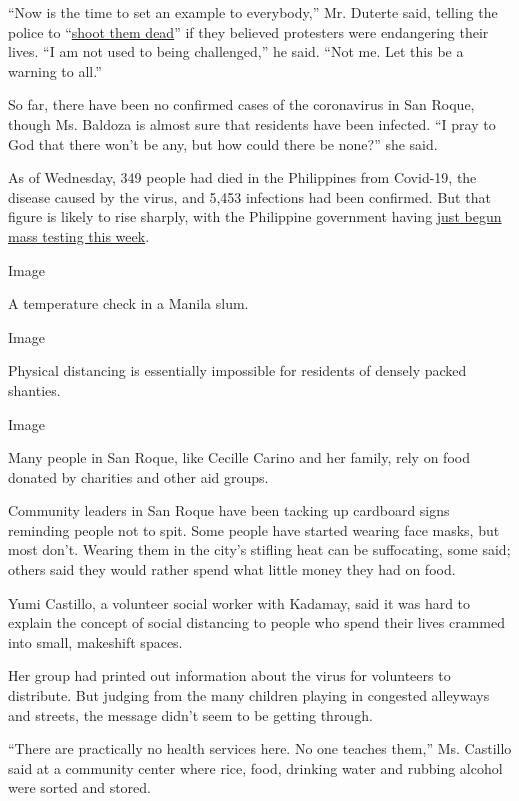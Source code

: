 ``Now is the time to set an example to everybody,'' Mr. Duterte said,
telling the police to
``\href{https://www.nytimes.com/reuters/2020/04/02/world/asia/02reuters-health-coronavirus-philippines-duterte.html?searchResultPosition=6}{shoot
them dead}'' if they believed protesters were endangering their lives.
``I am not used to being challenged,'' he said. ``Not me. Let this be a
warning to all.''

So far, there have been no confirmed cases of the coronavirus in San
Roque, though Ms. Baldoza is almost sure that residents have been
infected. ``I pray to God that there won't be any, but how could there
be none?'' she said.

As of Wednesday, 349 people had died in the Philippines from Covid-19,
the disease caused by the virus, and 5,453 infections had been
confirmed. But that figure is likely to rise sharply, with the
Philippine government having
\href{https://www.nytimes.com/reuters/2020/04/14/world/asia/14reuters-health-coronavirus-philippines.html?searchResultPosition=21}{just
begun mass testing this week}.

Image

A temperature check in a Manila slum.

Image

Physical distancing is essentially impossible for residents of densely
packed shanties.

Image

Many people in San Roque, like Cecille Carino and her family, rely on
food donated by charities and other aid groups.

Community leaders in San Roque have been tacking up cardboard signs
reminding people not to spit. Some people have started wearing face
masks, but most don't. Wearing them in the city's stifling heat can be
suffocating, some said; others said they would rather spend what little
money they had on food.

Yumi Castillo, a volunteer social worker with Kadamay, said it was hard
to explain the concept of social distancing to people who spend their
lives crammed into small, makeshift spaces.

Her group had printed out information about the virus for volunteers to
distribute. But judging from the many children playing in congested
alleyways and streets, the message didn't seem to be getting through.

``There are practically no health services here. No one teaches them,''
Ms. Castillo said at a community center where rice, food, drinking water
and rubbing alcohol were sorted and stored.

